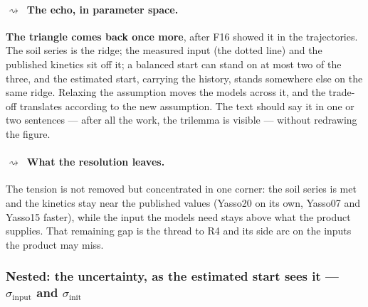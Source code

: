 \documentclass[11pt]{article}
\newcommand{\sinit}{\sigma_{\mathrm{init}}}
\newcommand{\sinput}{\sigma_{\mathrm{input}}}
\newcommand{\dparagraph}[1]{\paragraph{\textcolor{noterule}{$\rightsquigarrow$}\ #1}}
\begin{document}
\dparagraph{The echo, in parameter space.} \textbf{The triangle comes back once more}, after F16 showed it
in the trajectories. The
soil series is the ridge; the measured input (the dotted line) and the published kinetics sit off it; a
balanced start can stand on at most two of the three, and the estimated start, carrying the history,
stands somewhere else on the same ridge. Relaxing the assumption moves the models across it, and the
trade-off translates according to the new assumption. The text should say it in one or two sentences ---
after all the work, the trilemma is visible --- without redrawing the figure.

\dparagraph{What the resolution leaves.} The tension is not removed but concentrated in one corner: the soil
series is met and the kinetics stay near the published values (Yasso20 on its own, Yasso07 and Yasso15
faster), while the input the models need stays above what the product supplies. That remaining gap is the
thread to R4 and its side arc on the inputs the product may miss.

\subsubsection{Nested: the uncertainty, as the estimated start sees it --- $\sinput$ and $\sinit$}
\end{document}
